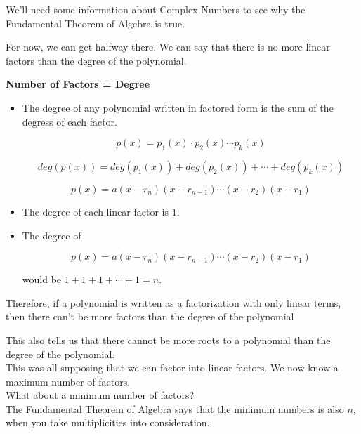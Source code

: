 \documentclass{ximera}
\begin{document}
We'll need some information about Complex Numbers to see why the Fundamental Theorem of Algebra is true.

For now, we can get halfway there. We can say that there is no more linear factors than the degree of the polynomial.



\begin{idea} \textbf{\textcolor{blue!55!black}{Number of Factors = Degree}}  \\


\begin{itemize}
\item The degree of any polynomial written in factored form is the sum of the degress of each factor.

\[
 p(x) = p_1(x) \cdot p_2(x) \cdots p_k(x)
\]

\[
deg(p(x)) = deg(p_1(x)) + deg(p_2(x)) + \cdots + deg(p_k(x))
\]


\[
 p(x) = a (x - r_n) (x - r_{n-1}) \cdots (x - r_2)  (x - r_1) 
\]

\item The degree of each linear factor is $1$. \\

\item The degree of 

\[
p(x) = a (x - r_n) (x - r_{n-1}) \cdots (x - r_2)  (x - r_1) 
\]

would be $1 + 1 + 1 + \cdots + 1 = n$.
\end{itemize}



Therefore, if a polynomial is written as a factorization with only linear terms, then there can't be more factors than the degree of the polynomial

\end{idea}

This also tells us that there cannot be more roots to a polynomial than the degree of the polynomial. \\


This was all supposing that we can factor into linear factors.  We now know a maximum number of factors. \\


What about a minimum number of factors? \\

The Fundamental Theorem of Algebra says that the minimum numbers is also $n$, when you take multiplicities into consideration. \\
\end{document}
